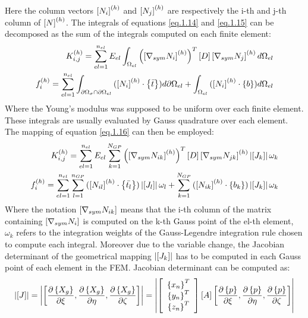 Here the column vectors $\left[{N_i}\right]^{(h)}$ and $\left[{N_j}\right]^{(h)}$ are respectively the i-th and j-th column of $\left[{N}\right]^{(h)}$.
The integrals of equations \eqref{eq.1.14} and \eqref{eq.1.15} can be decomposed as the sum of the integrals computed on each finite element: 
\begin{eqnarray}
{K}_{i,j}^{(h)}=\sum_{el=1}^{n_{el}}E_{el}\int_{\Omega_{el}}{\left(\left[{\nabla_{sym}N_i}\right]^{(h)}\right)^T \left[{D}\right]\left[{\nabla_{sym}N_j}\right]^{(h)}   d\Omega_{el}}\\
{f}_{i}^{(h)}=\sum_{el=1}^{n_{el}}\int_{\partial \Omega_{\sigma}\cap\partial \Omega_{el} }{(\left[{N_i}\right]^{(h)} \cdot \left\lbrace{\bar{t}}\right \rbrace )d\partial \Omega_{el}}+\int_{\Omega_{el}}{(\left[{N_i}\right]^{(h)}\cdot \left\lbrace{b}\right \rbrace) d\Omega_{el}}
\end{eqnarray}
Where the Young's modulus was supposed to be uniform over each finite element.
 These integrals are usually evaluated by Gauss quadrature over each element.
The mapping of equation \eqref{eq.1.16} can then be employed:
 \begin{eqnarray}
 {K}_{i,j}^{(h)}=\sum_{el=1}^{n_{el}}E_{el}\sum_{k=1}^{N_{GP}}{\left(\left[{\nabla_{sym}N_{ik}}\right]^{(h)}\right)^T \left[{D}\right]\left[{\nabla_{sym}N_{jk}}\right]^{(h)}\left|{\left[{J_k}\right]}\right|\omega_k}\\
 {f}_{i}^{(h)}=\sum_{el=1}^{n_{el}}\sum_{l=1}^{n_{GP}} {(\left[{N_{il}}\right]^{(h)} \cdot \left\lbrace{\bar{t_l}}\right \rbrace )\left|{\left[{J_l}\right]}\right|\omega_l}+\sum_{k=1}^{N_{GP}}{(\left[{N_{ik}}\right]^{(h)}\cdot \left\lbrace{b_k}\right \rbrace) \left|{\left[{J_k}\right]}\right|\omega_k}
 \end{eqnarray}
Where the notation $\left[{\nabla_{sym}N_{ik}}\right]$ means that the i-th column of the matrix containing $\left[{\nabla_{sym}N_{i}}\right]$ is computed on the k-th Gauss point of the el-th element, $\omega_k$ refers to the integration weights of the Gauss-Legendre integration rule chosen to compute each integral. Moreover due to the variable change, the Jacobian determinant of the geometrical mapping $\left|{\left[{J_k}\right]}\right|$ has to be computed in each Gauss point of each element in the FEM.
Jacobian determinant can be computed as:
\begin{equation}
\left|{\left[{J}\right]}\right| =\left|{\left[{\frac{\partial \left\lbrace{X_g}\right \rbrace}{\partial \xi},\frac{\partial \left\lbrace{X_g}\right \rbrace}{\partial \eta},\frac{\partial \left\lbrace{X_g}\right \rbrace}{\partial \zeta}}\right]}\right|=\left|{\left[{\begin{array}{c}\left\lbrace{x_n}\right \rbrace^T\\\left\lbrace{y_n}\right \rbrace^T\\\left\lbrace{z_n}\right \rbrace^T\end{array}}\right] \left[{A}\right]\left[{\frac{\partial \left\lbrace{p}\right \rbrace}{\partial \xi},\frac{\partial \left\lbrace{p}\right \rbrace}{\partial \eta},\frac{\partial \left\lbrace{p}\right \rbrace}{\partial \zeta}}\right]}\right| 
\end{equation}
